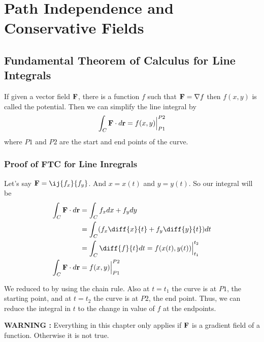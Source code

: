 

\chapter{Path Independence and Conservative Fields}

\bigbreak

\section{Fundamental Theorem of Calculus for Line Integrals}

\begin{mdframed}
    If given a vector field ${\bf F}$, there is a function $f$ such that ${\bf F} = \nabla f$ then $f(x, y)$ is called the potential.
    Then we can simplify the line integral by
    $$ \int_C {\bf F} \cdot d{\bf r} = f(x, y) \Big|_{P1}^{P2} $$
    where $P1$ and $P2$ are the start and end points of the curve.
\end{mdframed}

\subsection{Proof of FTC for Line Inregrals}

Let's say ${\bf F} = \ij{f_x}{f_y}$. 
And $x = x(t)$ and $y = y(t)$.
So our integral will be
\begin{align*}
\int_C {\bf F} \cdot d{\bf r} 
    &= \int_C f_x dx + f_y dy \\
    &= \int_C (f_x \diff{x}{t} + f_y \diff{y}{t} ) dt \\
    &= \int_C \diff{f}{t} dt = f(x(t), y(t)) \Big|_{t_1}^{t_2} \\
\int_C {\bf F} \cdot d{\bf r} 
    &= f(x, y) \Big|_{P1}^{P2} \\
\end{align*}

We reduced  to  by using the chain rule.
Also at $t = t_1$ the curve is at $P1$, the starting point, and at $t = t_2$ the curve is at $P2$, the end point.
Thus, we can reduce the integral in $t$ to the change in value of $f$ at the endpoints. 

{\bf WARNING : } Everything in this chapter only applies if ${\bf F}$ is a gradient field of a function.
Otherwise it is not true.


